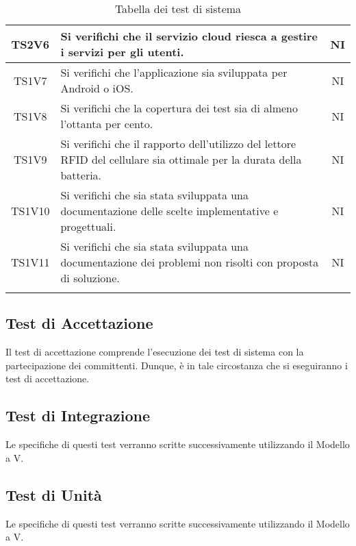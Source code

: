 \begin{center}
\begin{longtable}{|c|p{10cm}|c|}
			\hline
			TS2V6 & Si verifichi che il servizio cloud riesca a gestire i servizi per gli utenti. & NI \\	
			\hline
			TS1V7 & Si verifichi che l'applicazione sia sviluppata per Android o iOS. & NI \\	
			\hline
			TS1V8 & Si verifichi che la copertura dei test  sia di almeno l'ottanta per cento. & NI \\	
			\hline
			TS1V9 & Si verifichi che il rapporto dell'utilizzo del lettore RFID del cellulare sia ottimale per la durata della batteria. & NI \\	
			\hline
			TS1V10 & Si verifichi che sia stata sviluppata una documentazione delle scelte implementative e progettuali. & NI \\	
			\hline
			TS1V11 & Si verifichi che sia stata sviluppata una documentazione dei problemi non risolti con proposta di soluzione. & NI \\	
			\hline
			\hiderowcolors
			\caption{Tabella dei test di sistema}		
		\end{longtable}	
	\end{center}

	\subsection{Test di Accettazione}
	Il test di accettazione comprende l'esecuzione dei test di sistema con la partecipazione dei committenti. Dunque, è in tale circostanza che si eseguiranno i test di accettazione. 
	\subsection{Test di Integrazione}
	Le specifiche di questi test verranno scritte successivamente utilizzando il Modello a V.
	\subsection{Test di Unità}
	Le specifiche di questi test verranno scritte successivamente utilizzando il Modello a V.